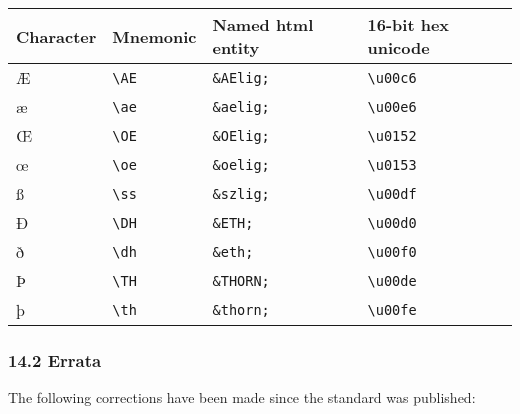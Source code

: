 \begin{longtable}[]{@{}llll@{}}
\toprule
Character & Mnemonic & Named html entity & 16-bit hex
unicode\tabularnewline
\midrule
\endhead
Æ & \texttt{\textbackslash{}AE} & \texttt{\&AElig;} &
\texttt{\textbackslash{}u00c6}\tabularnewline
æ & \texttt{\textbackslash{}ae} & \texttt{\&aelig;} &
\texttt{\textbackslash{}u00e6}\tabularnewline
Œ & \texttt{\textbackslash{}OE} & \texttt{\&OElig;} &
\texttt{\textbackslash{}u0152}\tabularnewline
œ & \texttt{\textbackslash{}oe} & \texttt{\&oelig;} &
\texttt{\textbackslash{}u0153}\tabularnewline
ß & \texttt{\textbackslash{}ss} & \texttt{\&szlig;} &
\texttt{\textbackslash{}u00df}\tabularnewline
Ð & \texttt{\textbackslash{}DH} & \texttt{\&ETH;} &
\texttt{\textbackslash{}u00d0}\tabularnewline
ð & \texttt{\textbackslash{}dh} & \texttt{\&eth;} &
\texttt{\textbackslash{}u00f0}\tabularnewline
Þ & \texttt{\textbackslash{}TH} & \texttt{\&THORN;} &
\texttt{\textbackslash{}u00de}\tabularnewline
þ & \texttt{\textbackslash{}th} & \texttt{\&thorn;} &
\texttt{\textbackslash{}u00fe}\tabularnewline
\bottomrule
\end{longtable}

\hypertarget{errata}{\subsubsection{14.2 Errata}\label{errata}}

The following corrections have been made since the standard was
published:

